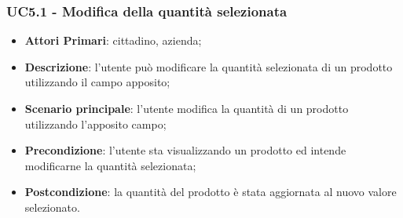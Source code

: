  \subsubsection{UC5.1 - Modifica della quantità selezionata}
 \begin{itemize}
 	\item \textbf{Attori Primari}: cittadino, azienda;
 	\item \textbf{Descrizione}: l'utente può modificare la quantità selezionata di un prodotto utilizzando il campo apposito;
 	\item \textbf{Scenario principale}: l'utente modifica la quantità di un prodotto utilizzando l'apposito campo;
 	\item \textbf{Precondizione}: l'utente sta visualizzando un prodotto ed intende modificarne la quantità selezionata;
 	\item \textbf{Postcondizione}: la quantità del prodotto è stata aggiornata al nuovo valore selezionato.
 \end{itemize}
